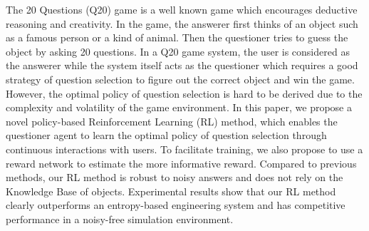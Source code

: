 The 20 Questions (Q20) game is a well known game which encourages deductive reasoning and creativity. In the game, the answerer first thinks of an object such as a famous person or a kind of animal. Then the questioner tries to guess the object by asking 20 questions. In a Q20 game system, the user is considered as the answerer while the system itself acts as the questioner which requires a good strategy of question selection to figure out the correct object and win the game. However, the optimal policy of question selection is hard to be derived due to the complexity and volatility of the game environment. In this paper, we propose a novel policy-based Reinforcement Learning (RL) method, which enables the questioner agent to learn the optimal policy of  question selection through continuous interactions with users. To facilitate training, we also propose to use a reward network to estimate the more informative reward. Compared to previous methods, our RL method is robust to noisy answers and does not rely on the Knowledge Base of objects. Experimental results show that our RL method clearly outperforms an entropy-based engineering system and has competitive performance in a noisy-free simulation environment.
